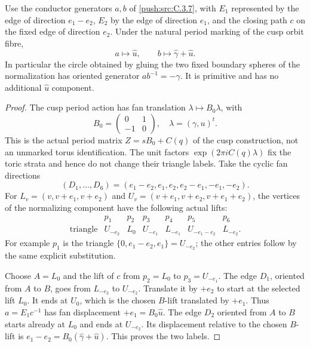 \begin{lemma}\label{push:src:C.3.9}
Use the conductor generators \(a,b\) of \ref{push:src:C.3.7}, with
\(E_1\) represented by the edge of direction \(e_1-e_2\),
\(E_2\) by the edge of direction \(e_1\), and the closing path
\(c\) on the fixed edge of direction \(e_2\). Under the
natural period marking of the cusp orbit fibre,
\[
 a\longmapsto\widehat u,\qquad
 b\longmapsto\widehat\gamma+\widehat u.
\]
In particular the circle obtained by gluing the two fixed boundary
spheres of the normalization has oriented generator
\(ab^{-1}=-\widehat\gamma\). It is primitive and has no
additional \(\widehat u\) component.
\end{lemma}
\begin{proof}
The cusp period action has fan translation
\(\lambda\mapsto B_0\lambda\), with
\[
 B_0=\begin{pmatrix}0&1\\-1&0\end{pmatrix},
 \quad \lambda=(\gamma,u)^t.
\]
This is the actual period matrix
\(Z=sB_0+C(q)\) of the cusp construction, not an unmarked
torus identification. The unit factors \(\exp(2\pi i C(q)\lambda)\)
fix the toric strata and hence do not change their triangle labels.
Take the cyclic fan directions
\[
 (D_1,\ldots,D_6)=
 (e_1-e_2,e_1,e_2,e_2-e_1,-e_1,-e_2).
\]
For \(L_v=(v,v+e_1,v+e_2)\) and
\(U_v=(v+e_1,v+e_2,v+e_1+e_2)\), the vertices of the
normalizing component have the following actual lifts:
\[
 \begin{array}{c|cccccc}
 &p_1&p_2&p_3&p_4&p_5&p_6\\\hline
 \text{triangle}&U_{-e_2}&L_0&U_{-e_1}&L_{-e_1}
                 &U_{-e_1-e_2}&L_{-e_2}.
 \end{array}
\]
For example \(p_1\) is the triangle
\(\{0,e_1-e_2,e_1\}=U_{-e_2}\); the other entries follow
by the same explicit substitution.

Choose \(A=L_0\) and the lift of \(c\) from
\(p_2=L_0\) to \(p_3=U_{-e_1}\).
The edge \(D_1\), oriented from \(A\) to \(B\), goes
from \(L_{-e_2}\) to \(U_{-e_2}\). Translate it by
\(+e_2\) to start at the selected lift \(L_0\).
It ends at \(U_0\), which is the chosen \(B\)-lift
translated by \(+e_1\). Thus \(a=E_1c^{-1}\) has
fan displacement \(+e_1=B_0\widehat u\).
The edge \(D_2\) oriented from \(A\) to \(B\)
starts already at \(L_0\) and ends at \(U_{-e_2}\).
Its displacement relative to the chosen \(B\)-lift is
\(e_1-e_2=B_0(\widehat\gamma+\widehat u)\).
This proves the two labels.


\end{proof}
